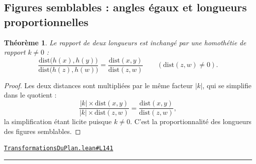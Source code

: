 \documentclass[11pt,a4paper]{article}
\theoremstyle{definition}
\theoremstyle{plain}
\newtheorem{theoreme}{Théorème}
\newcommand{\source}[2]{\par\smallskip\noindent\hfill{\footnotesize\href{#1}{\texttt{#2}}}\par\smallskip}
\begin{document}
\subsection{Figures semblables : angles égaux et longueurs proportionnelles}

\begin{theoreme}
Le rapport de deux longueurs est inchangé par une homothétie de rapport
$k \ne 0$ :
\[ \frac{\mathrm{dist}\bigl(h(x), h(y)\bigr)}{\mathrm{dist}\bigl(h(z), h(w)\bigr)}
   = \frac{\mathrm{dist}(x, y)}{\mathrm{dist}(z, w)} \qquad (\mathrm{dist}(z,w) \ne 0) . \]
\end{theoreme}

\begin{proof}
Les deux distances sont multipliées par le même facteur $|k|$, qui se simplifie dans le
quotient :
\[ \frac{|k| \times \mathrm{dist}(x,y)}{|k| \times \mathrm{dist}(z,w)}
   = \frac{\mathrm{dist}(x,y)}{\mathrm{dist}(z,w)} , \]
la simplification étant licite puisque $k \ne 0$. C'est la proportionnalité des longueurs
des figures semblables.
\end{proof}
\source{https://github.com/Commutator-IO/learn-lean/blob/main/courses/01-college/03-transformations-du-plan/TransformationsDuPlan.lean\#L141}{TransformationsDuPlan.lean\#L141}

\vfill
\noindent\rule{0.35\linewidth}{0.4pt}\par
{}
\end{document}
